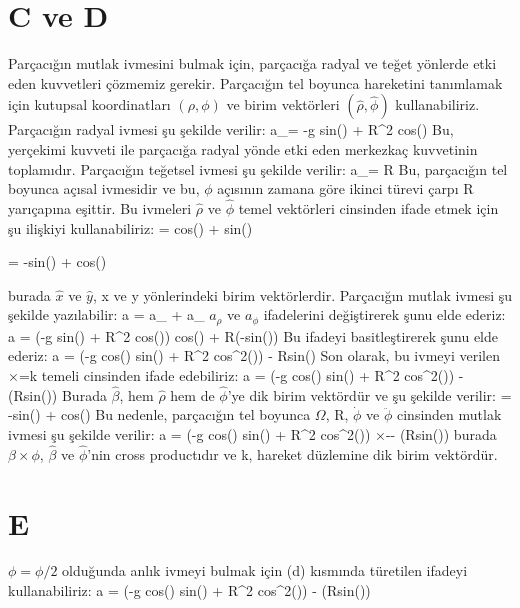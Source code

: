\documentclass[12pt]{article}
\begin{document}
\section{C ve D}
Parçacığın mutlak ivmesini bulmak için, parçacığa radyal ve teğet yönlerde etki eden kuvvetleri çözmemiz gerekir. Parçacığın tel boyunca hareketini tanımlamak için kutupsal koordinatları $(\rho, \phi)$ ve birim vektörleri $(\hat\rho, \hat\phi)$ kullanabiliriz.
\bigbreak
Parçacığın radyal ivmesi şu şekilde verilir:
\bigbreak
a_\rho = -g sin(\phi) + R\Omega^2 cos(\phi)
\bigbreak
Bu, yerçekimi kuvveti ile parçacığa radyal yönde etki eden merkezkaç kuvvetinin toplamıdır.
Parçacığın teğetsel ivmesi şu şekilde verilir:
\bigbreak
a_\phi = R\ddot\phi
Bu, parçacığın tel boyunca açısal ivmesidir ve bu, $\phi$ açısının zamana göre ikinci türevi çarpı R yarıçapına eşittir.
\bigbreak
Bu ivmeleri $\hat\rho$ ve $\hat\phi$ temel vektörleri cinsinden ifade etmek için şu ilişkiyi kullanabiliriz:
\bigbreak
\hat\rho = cos(\phi)  + sin(\phi) 

\hat\phi = -sin(\phi)  + cos(\phi) 
\bigbreak

burada $\hat{x}$ ve $\hat{y}$, x ve y yönlerindeki birim vektörlerdir.
\bigbreak
Parçacığın mutlak ivmesi şu şekilde yazılabilir:
\bigbreak
a = a_{\rho} \hat\rho + a_{\phi} \hat{\phi}
\bigbreak
$a_{\rho}$ ve $a_{\phi}$ ifadelerini değiştirerek şunu elde ederiz:
\bigbreak
a = (-g sin(\phi) + R\Omega^2 cos(\phi)) cos(\phi) \hat{\rho} + R\ddot\phi (-sin(\phi)) \hat{\phi}
\bigbreak
Bu ifadeyi basitleştirerek şunu elde ederiz:
\bigbreak
a = (-g cos(\phi) sin(\phi) + R\Omega^2 cos^2(\phi)) \hat{\rho} - R\ddot\phi sin(\phi) \hat{\phi}
\bigbreak
Son olarak, bu ivmeyi verilen \beta×\phi=k temeli cinsinden ifade edebiliriz:
\bigbreak
a = (-g cos(\phi) sin(\phi) + R\Omega^2 cos^2(\phi)) \hat{\beta} - (R\ddot\phi sin(\phi)) \hat{\phi}
\newpage
Burada $\hat{\beta}$, hem $\hat{\rho}$ hem de $\hat{\phi}$'ye dik birim vektördür ve şu şekilde verilir:
\bigbreak
\hat{\beta} = -sin(\phi)  + cos(\phi) 
\bigbreak
Bu nedenle, parçacığın tel boyunca $\Omega$, R, $\dot\phi$ ve $\ddot\phi$ cinsinden mutlak ivmesi şu şekilde verilir:
\bigbreak
a = (-g cos(\phi) sin(\phi) + R\Omega^2 cos^2(\phi)) \beta×-\phi - (R\ddot\phi sin(\phi)) \phi
\bigbreak
burada $\beta\times\phi$, $\hat{\beta}$ ve $\hat{\phi}$'nin cross productıdır ve k, hareket düzlemine dik birim vektördür.
\newpage
\section{E}
$\phi = \phi/2$ olduğunda anlık ivmeyi bulmak için (d) kısmında türetilen ifadeyi kullanabiliriz:
\bigbreak
a = (-g cos(\phi) sin(\phi) + R\Omega^2 cos^2(\phi)) \beta\times\phi - (R\ddot\phi sin(\phi)) \phi
\end{document}
